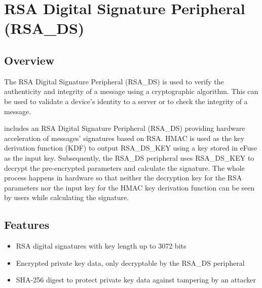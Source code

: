 \documentclass[main\_\_EN.tex]{subfiles}
\begin{document}

\ifglobal
\else
    {\let\clearpage\relax \listoftodos}
    {\let\clearpage\relax \listofdonetodos}
    \tableofcontents
\fi



\chapter{RSA Digital Signature Peripheral (RSA\_DS)}
\label{mod:digsig}
\hypertarget{digsig}{}\hypertarget{rsads}{}

\section{Overview}

The RSA Digital Signature Peripheral (RSA\_DS) is used to verify the authenticity and integrity of a message using a cryptographic algorithm. This can be used to validate a device's identity to a server or to check the integrity of a message.

\chipname{} includes an RSA Digital Signature Peripheral (RSA\_DS) providing hardware acceleration of messages' signatures based on RSA. HMAC is used as the key derivation function (KDF) to output RSA\_DS\_KEY using a key stored in eFuse as the input key. Subsequently, the RSA\_DS peripheral uses RSA\_DS\_KEY to decrypt the pre-encrypted parameters and calculate the signature. The whole process happens in hardware so that neither the decryption key for the RSA parameters nor the input key for the HMAC key derivation function can be seen by users while calculating the signature.

\section{Features}

\begin{itemize}
\item RSA digital signatures with key length up to 3072 bits
\item Encrypted private key data, only decryptable by the RSA\_DS peripheral
\item SHA-256 digest to protect private key data against tampering by an attacker
\end{itemize}
\end{document}
